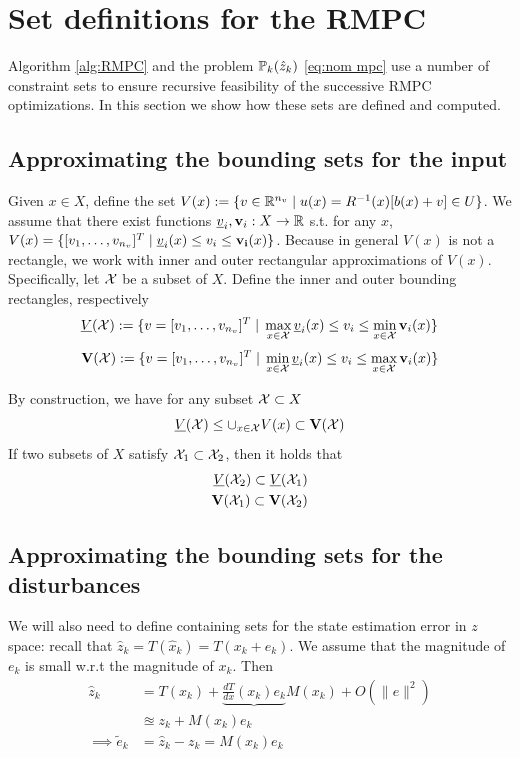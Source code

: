 \section{Set definitions for the RMPC}

Algorithm \ref{alg:RMPC} and the problem $\mathbb{P}_{k}(\hat{z}_{k})$ \eqref{eq:nom mpc} use a number of constraint sets to ensure recursive feasibility of the successive RMPC optimizations.
In this section we show how these sets are defined and computed.

\subsection{Approximating the bounding sets for the input}
\label{sec:approx input sets}
Given $x \in X$, define the set $V(x) := \{v \in \mathbb{R}^{n_v} \;|\; u(x) = R^{-1}(x)[b(x)+v] \in U\}$.
We assume that there exist functions $\underline{v}_i, \mathbf{v}_i: X \rightarrow \mathbb{R}$ s.t. for any $x$, $V(x) = \{[v_1,\ldots,v_{n_v}]^T \;|\; \underline{v}_i(x) \leq v_i \leq \mathbf{v_i}(x) \}$.
Because in general $V(x)$ is not a rectangle, we work with inner and outer rectangular approximations of $V(x)$.
Specifically, let $\mathcal{X}$ be a subset of $X$.
Define the inner and outer bounding rectangles, respectively
\[\underline{V}(\mathcal{X}) := \{v=[v_1,\ldots,v_{n_v}]^T \;|\; \max_{x\in \mathcal{X}} \underline{v}_i(x)  \leq v_i \leq \min_{x \in \mathcal{X}} \mathbf{v}_i(x) \} \]
\[\mathbf{V}(\mathcal{X}) := \{v=[v_1,\ldots,v_{n_v}]^T \;|\; \min_{x\in \mathcal{X}} \underline{v}_i(x)  \leq v_i \leq \max_{x \in \mathcal{X}} \mathbf{v}_i(x) \} \]

By construction, we have for any subset $\mathcal{X} \subset X$
\begin{equation}
\label{eq:Vbounds}
\underline{V}(\mathcal{X}) \leq \cup_{x \in \mathcal{X}} V(x) \subset \mathbf{V}(\mathcal{X})
\end{equation}
If two subsets of $X$ satisfy $\mathcal{X}_1 \subset \mathcal{X}_2$, then it holds that 
\begin{eqnarray}
\label{eq:V inclusions}
\underline{V}(\mathcal{X}_2) \subset \underline{V}(\mathcal{X}_1)
\nonumber
\\
\mathbf{V}(\mathcal{X}_1) \subset \mathbf{V}(\mathcal{X}_2)
\end{eqnarray}


\subsection{Approximating the bounding sets for the disturbances}
\label{sec:approx dist}
We will also need to define containing sets for the state estimation error in $z$ space:
recall that $\hat{z}_k = T(\hat{x}_k) = T(x_k+e_k)$. We assume that the magnitude of $e_k$ is small w.r.t the magnitude of $x_k$. Then
\begin{subequations}
\label{eq:err_lin}
\begin{align}
\hat{z}_k &= T(x_k) + \underbrace{\frac{dT}{dx}(x_k)e_k }{M(x_k)}+ O(\|e\|^2) \nonumber 
\\
&\approxeq z_k + M(x_k)e_k  \nonumber
\\
\implies \tilde{e}_k &= \hat{z}_k - z_k = M(x_k)e_k
\end{align}
\end{subequations}

